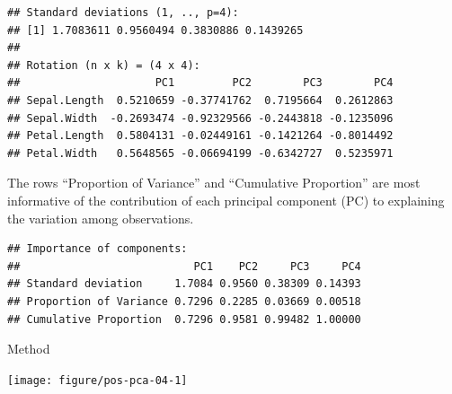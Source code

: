 \documentclass[krantz2]{krantz}\usepackage{knitr}%
\begin{document}
\begin{knitrout}\footnotesize
{}\color{fgcolor}\begin{kframe}
\begin{alltt}
\end{alltt}
\begin{verbatim}
## Standard deviations (1, .., p=4):
## [1] 1.7083611 0.9560494 0.3830886 0.1439265
## 
## Rotation (n x k) = (4 x 4):
##                     PC1         PC2        PC3        PC4
## Sepal.Length  0.5210659 -0.37741762  0.7195664  0.2612863
## Sepal.Width  -0.2693474 -0.92329566 -0.2443818 -0.1235096
## Petal.Length  0.5804131 -0.02449161 -0.1421264 -0.8014492
## Petal.Width   0.5648565 -0.06694199 -0.6342727  0.5235971
\end{verbatim}
\end{kframe}
\end{knitrout}

The rows ``Proportion of Variance'' and ``Cumulative Proportion'' are most informative of the contribution of each principal component (PC) to explaining the variation among observations.
\begin{knitrout}\footnotesize
{}\color{fgcolor}\begin{kframe}
\begin{alltt}
\end{alltt}
\begin{verbatim}
## Importance of components:
##                           PC1    PC2     PC3     PC4
## Standard deviation     1.7084 0.9560 0.38309 0.14393
## Proportion of Variance 0.7296 0.2285 0.03669 0.00518
## Cumulative Proportion  0.7296 0.9581 0.99482 1.00000
\end{verbatim}
\end{kframe}
\end{knitrout}

Method 
\begin{knitrout}\footnotesize
{}\color{fgcolor}\begin{kframe}
\begin{alltt}
\end{alltt}
\end{kframe}

{\centering \texttt{[image: figure/pos-pca-04-1]} 

}



\end{knitrout}
\end{document}
